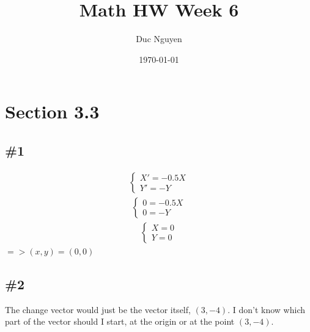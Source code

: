 \documentclass[12pt]{article}
\title{Math HW Week 6}
\author{Duc Nguyen}
\date{\today}
\begin{document}
\maketitle
\section*{Section 3.3}
\subsection*{\#1}
\begin{align*}
    \begin{cases}
    X' = -0.5X \\
    Y' = -Y
    \end{cases}
\end{align*}
\begin{align*}
    \begin{cases}
    0 = -0.5X \\
    0 = -Y
    \end{cases}
\end{align*}
\begin{align*}
    \begin{cases}
    X = 0 \\
    Y = 0
    \end{cases}
\end{align*}
$=> (x,y) = (0,0)$
\subsection*{\#2}
The change vector would just be the vector itself, $(3,-4)$. I don't know which part of the vector should I start, at the origin or at the point $(3,-4)$.

\end{document}

